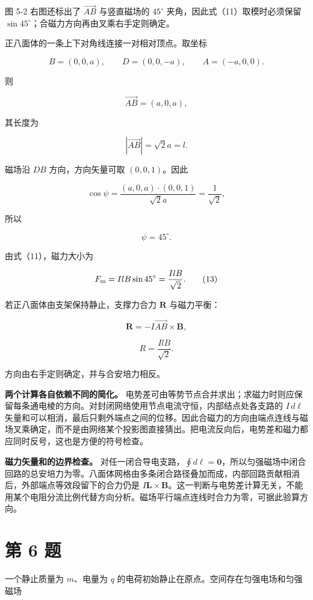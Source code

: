 \documentclass[12pt,a4paper,UTF8]{ctexart}
\begin{document}
图 5-2 右图还标出了 \(\overrightarrow{AB}\) 与竖直磁场的 \(45^\circ\)
夹角，因此式（11）取模时必须保留
\(\sin45^\circ\)；合磁力方向再由叉乘右手定则确定。

正八面体的一条上下对角线连接一对相对顶点。取坐标

\[
B=(0,0,a),
\qquad
D=(0,0,-a),
\qquad
A=(-a,0,0).
\]

则

\[
\overrightarrow{AB}=(a,0,a),
\]

其长度为

\[
|\overrightarrow{AB}|=\sqrt2a=l.
\]

磁场沿 \(DB\) 方向，方向矢量可取 \((0,0,1)\)。因此

\[
\cos\psi
=\frac{(a,0,a)\cdot(0,0,1)}{\sqrt2a}
=\frac1{\sqrt2},
\]

所以

\[
\psi=45^\circ.
\tag{12}
\]

由式（11），磁力大小为

\[
F_{\rm m}=IlB\sin45^\circ
=\frac{IlB}{\sqrt2}.
\tag{13}
\]

若正八面体由支架保持静止，支撑力合力 \(\bm R\) 与磁力平衡：

\[
\boxed{\bm R=-I\overrightarrow{AB}\times\bm B},
\]

\[
\boxed{R=\frac{IlB}{\sqrt2}}.
\tag{14}
\]

方向由右手定则确定，并与合安培力相反。

\textbf{两个计算各自依赖不同的简化。}
电势差可由等势节点合并求出；求磁力时则应保留每条通电棱的方向。对封闭网络使用节点电流守恒，内部结点处各支路的
\(I\,d\boldsymbol\ell\)
矢量和可以相消，最后只剩外端点之间的位移。因此合磁力的方向由端点连线与磁场叉乘确定，而不是由网络某个投影图直接猜出。把电流反向后，电势差和磁力都应同时反号，这也是方便的符号检查。

\textbf{磁力矢量和的边界检查。}
对任一闭合导电支路，\(\oint d\boldsymbol\ell=\boldsymbol0\)，所以匀强磁场中闭合回路的总安培力为零。八面体网格由多条闭合路径叠加而成，内部回路贡献相消后，外部端点等效段留下的合力仍是
\(I\boldsymbol L\times\boldsymbol B\)。这一判断与电势差计算无关，不能用某个电阻分流比例代替方向分析。磁场平行端点连线时合力为零，可据此验算方向。

\newpage

\section{第 6 题}\label{ux7b2c-6-ux9898}

一个静止质量为 \(m\)、电量为 \(q\)
的电荷初始静止在原点。空间存在匀强电场和匀强磁场
\end{document}

